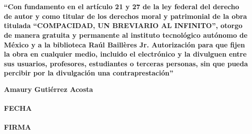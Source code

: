 \begin{titlepage}

\hfill\\
\hfill\\


\vspace{4cm}

\textbf{ ``Con fundamento en el art\'iculo 21 y 27 de la ley federal del derecho de autor y como titular de los derechos moral y patrimonial de la obra titulada ``COMPACIDAD, UN BREVIARIO AL INFINITO'', otorgo de manera gratuita y permanente al instituto tecnol\'ogico aut\'onomo de M\'exico y a la biblioteca Ra\'ul Baill\`eres Jr. Autorizaci\'on para que fijen la obra en cualquier medio, incluido el electr\'onico y la divulguen entre sus usuarios, profesores, estudiantes o terceras personas, sin que pueda percibir por la divulgaci\'on una contraprestaci\'on''}

\vspace{1cm}
\begin{center}
\textbf{Amaury Guti\'errez Acosta}\\
\makebox[2in]{\hrulefill}\\
\textbf{FECHA}\\
\makebox[2in]{\hrulefill}\\
\textbf{FIRMA}\\
\end{center}
\medskip




\end{titlepage}
\endinput